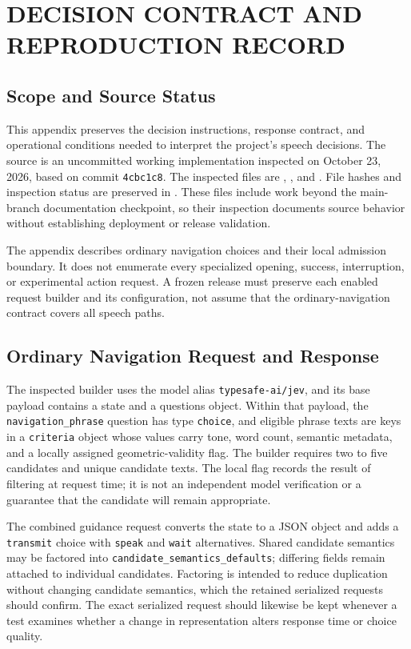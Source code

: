 \chapter{DECISION CONTRACT AND REPRODUCTION RECORD}
\label{app:decision-contract}
\newpage
\section{Scope and Source Status}
This appendix preserves the decision instructions, response contract, and operational conditions needed to interpret the project's speech decisions. The source is an uncommitted working implementation inspected on October 23, 2026, based on commit \texttt{4cbc1c8}. The inspected files are , , and . File hashes and inspection status are preserved in . These files include work beyond the main-branch documentation checkpoint, so their inspection documents source behavior without establishing deployment or release validation.

The appendix describes ordinary navigation choices and their local admission boundary. It does not enumerate every specialized opening, success, interruption, or experimental action request. A frozen release must preserve each enabled request builder and its configuration, not assume that the ordinary-navigation contract covers all speech paths.

\section{Ordinary Navigation Request and Response}
The inspected builder uses the model alias \texttt{typesafe-ai/jev}, and its base payload contains a state and a questions object. Within that payload, the \texttt{navigation\_phrase} question has type \texttt{choice}, and eligible phrase texts are keys in a \texttt{criteria} object whose values carry tone, word count, semantic metadata, and a locally assigned geometric-validity flag. The builder requires two to five candidates and unique candidate texts. The local flag records the result of filtering at request time; it is not an independent model verification or a guarantee that the candidate will remain appropriate.

The combined guidance request converts the state to a JSON object and adds a \texttt{transmit} choice with \texttt{speak} and \texttt{wait} alternatives. Shared candidate semantics may be factored into \texttt{candidate\_semantics\_defaults}; differing fields remain attached to individual candidates. Factoring is intended to reduce duplication without changing candidate semantics, which the retained serialized requests should confirm. The exact serialized request should likewise be kept whenever a test examines whether a change in representation alters response time or choice quality.

